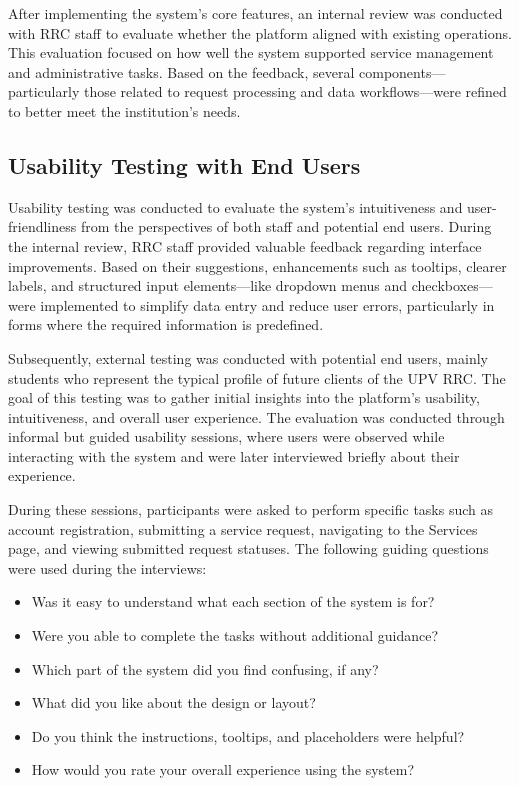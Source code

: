 After implementing the system's core features, an internal review was conducted with RRC staff to evaluate whether the platform aligned with existing operations. This evaluation focused on how well the system supported service management and administrative tasks. Based on the feedback, several components—particularly those related to request processing and data workflows—were refined to better meet the institution’s needs.

\subsection{Usability Testing with End Users}

Usability testing was conducted to evaluate the system’s intuitiveness and user-friendliness from the perspectives of both staff and potential end users. During the internal review, RRC staff provided valuable feedback regarding interface improvements. Based on their suggestions, enhancements such as tooltips, clearer labels, and structured input elements—like dropdown menus and checkboxes—were implemented to simplify data entry and reduce user errors, particularly in forms where the required information is predefined.

Subsequently, external testing was conducted with potential end users, mainly students who represent the typical profile of future clients of the UPV RRC. The goal of this testing was to gather initial insights into the platform's usability, intuitiveness, and overall user experience. The evaluation was conducted through informal but guided usability sessions, where users were observed while interacting with the system and were later interviewed briefly about their experience.

During these sessions, participants were asked to perform specific tasks such as account registration, submitting a service request, navigating to the Services page, and viewing submitted request statuses. The following guiding questions were used during the interviews:

\begin{itemize}
	\item Was it easy to understand what each section of the system is for?
	\item Were you able to complete the tasks without additional guidance?
	\item Which part of the system did you find confusing, if any?
	\item What did you like about the design or layout?
	\item Do you think the instructions, tooltips, and placeholders were helpful?
	\item How would you rate your overall experience using the system?
\end{itemize}

